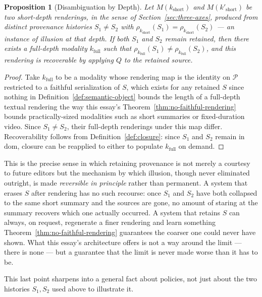 \documentclass[11pt]{article}
\newtheorem{proposition}[theorem]{Proposition}
\theoremstyle{definition}
\begin{document}
\begin{proposition}[Disambiguation by Depth]
\label{prop:disambiguation-depth}
Let $M(k_{\mathrm{short}})$ and $M(k'_{\mathrm{short}})$ be two short-depth renderings, in the sense of Section~\ref{sec:three-axes}, produced from distinct provenance histories $S_1 \neq S_2$ with $\rho_{k_{\mathrm{short}}}(S_1) = \rho_{k_{\mathrm{short}}}(S_2)$ --- an instance of illusion at that depth. If both $S_1$ and $S_2$ remain retained, then there exists a full-depth modality $k_{\mathrm{full}}$ such that $\rho_{k_{\mathrm{full}}}(S_1) \neq \rho_{k_{\mathrm{full}}}(S_2)$, and this rendering is recoverable by applying $Q$ to the retained source.
\end{proposition}

\begin{proof}
Take $k_{\mathrm{full}}$ to be a modality whose rendering map is the identity on $\mathcal{P}$ restricted to a faithful serialization of $S$, which exists for any retained $S$ since nothing in Definition~\ref{def:semantic-object} bounds the length of a full-depth textual rendering the way this essay's Theorem~\ref{thm:no-faithful-rendering} bounds practically-sized modalities such as short summaries or fixed-duration video. Since $S_1 \neq S_2$, their full-depth renderings under this map differ. Recoverability follows from Definition~\ref{def:closure}: since $S_1$ and $S_2$ remain in $\mathrm{dom}$, closure can be reapplied to either to populate $k_{\mathrm{full}}$ on demand.
\end{proof}

This is the precise sense in which retaining provenance is not merely a courtesy to future editors but the mechanism by which illusion, though never eliminated outright, is made \emph{reversible in principle} rather than permanent. A system that erases $S$ after rendering has no such recourse: once $S_1$ and $S_2$ have both collapsed to the same short summary and the sources are gone, no amount of staring at the summary recovers which one actually occurred. A system that retains $S$ can always, on request, regenerate a finer rendering and learn something Theorem~\ref{thm:no-faithful-rendering} guarantees the coarser one could never have shown. What this essay's architecture offers is not a way around the limit --- there is none --- but a guarantee that the limit is never made worse than it has to be.

This last point sharpens into a general fact about policies, not just about the two histories $S_1, S_2$ used above to illustrate it.
\end{document}
